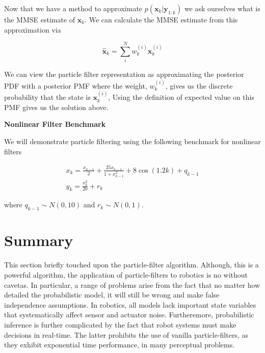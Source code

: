 Now that we have a method to approximate $p(\mathbf{x}_k | \mathbf{y}_{1:k})$ we ask ourselves what is the MMSE estimate of $\mathbf{x}_k$.
We can  calculate the MMSE estimate from this approximation via

\begin{equation}
\hat{\mathbf{x}}_k = \sum_{i}^{N} w_{k}^{(i)} \mathbf{x}_{k}^{(i)}
\end{equation}

We can view the particle filter representation as approximating the posterior PDF with a posterior PMF where the weight, $w_{k}^{(i)}$, 
gives us the discrete probability that the state is $\mathbf{x}_{k}^{(i)}$, Using the definition of expected value on this PMF gives us the solution above.


\begin{framed}
\begin{exmp}{\textbf{Nonlinear Filter Benchmark}}

We will demonstrate particle filtering using the following benchmark for nonlinear filters

\begin{eqnarray}
x_k = \frac{x_{k-1}}{2} + \frac{25x_{k-1}}{1 + x_{k-1}^2} + 8 \cos(1.2k) + q_{k-1} \\
y_k = \frac{x_{k}^2}{20} + r_k
\end{eqnarray}

where $q_{k-1}\sim N(0,10)$ and $r_k \sim N(0,1)$.
\end{exmp}
\end{framed}



\section{Summary}
This section briefly touched upon the particle-filter algorithm. Although, this is a powerful algorithm, the application
of particle-filters to robotics is no without cavetas. In particular, a range of problems arise from the fact that no
matter how detailed the probabilistic model, it will still be wrong and make false independence assumptions. In robotics,
all models lack important state variables that systematically affect sensor and actuator noise. Furtheremore, 
probabilistic inference is further complicated by the fact that robot systems must make decisions in real-time. The latter 
prohibits the use of vanilla particle-filters, as they exhibit exponential time performance, in many perceptual problems.


